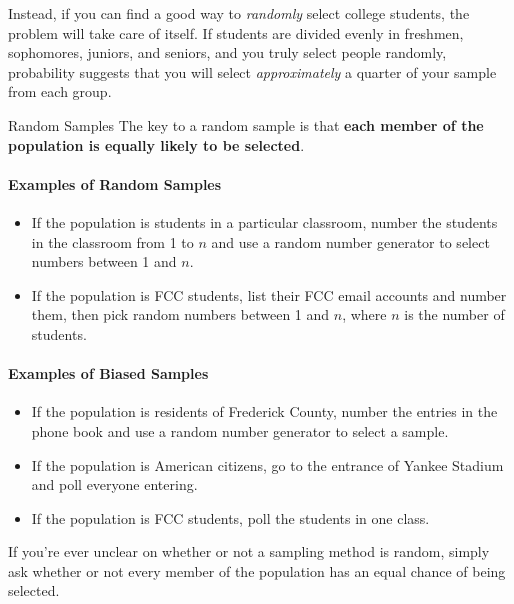 Instead, if you can find a good way to \emph{randomly} select college students, the problem will take care of itself.  If students are divided evenly in freshmen, sophomores, juniors, and seniors, and you truly select people randomly, probability suggests that you will select \emph{approximately} a quarter of your sample from each group.
\pagebreak

\begin{proc}{Random Samples}
The key to a random sample is that \textbf{each member of the population is equally likely to be selected}.
\end{proc}

\paragraph{Examples of Random Samples}
\begin{itemize}
\item If the population is students in a particular classroom, number the students in the classroom from 1 to $n$ and use a random number generator to select numbers between 1 and $n$.
\item If the population is FCC students, list their FCC email accounts and number them, then pick random numbers between 1 and $n$, where $n$ is the number of students.
\end{itemize}

\paragraph{Examples of Biased Samples}
\begin{itemize}
\item {}If the population is residents of Frederick County, number the entries in the phone book and use a random number generator to select a sample.
\item If the population is American citizens, go to the entrance of Yankee Stadium and poll everyone entering.
\item If the population is FCC students, poll the students in one class.
\end{itemize}

If you're ever unclear on whether or not a sampling method is random, simply ask whether or not every member of the population has an equal chance of being selected.

